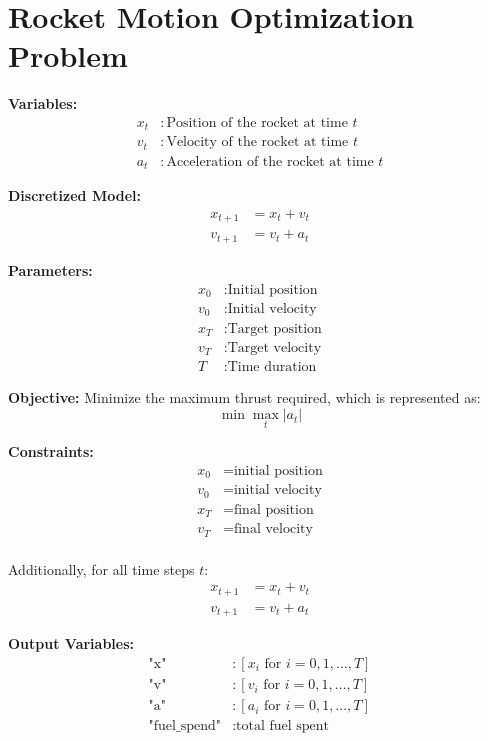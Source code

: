 \documentclass{article}
\begin{document}
\section*{Rocket Motion Optimization Problem}

\textbf{Variables:}
\begin{align*}
x_t & : \text{Position of the rocket at time } t \\
v_t & : \text{Velocity of the rocket at time } t \\
a_t & : \text{Acceleration of the rocket at time } t 
\end{align*}

\textbf{Discretized Model:}
\begin{align*}
x_{t+1} & = x_t + v_t \\
v_{t+1} & = v_t + a_t 
\end{align*}

\textbf{Parameters:}
\begin{align*}
x_0 & : \text{Initial position} \\
v_0 & : \text{Initial velocity} \\
x_T & : \text{Target position} \\
v_T & : \text{Target velocity} \\
T & : \text{Time duration}
\end{align*}

\textbf{Objective:} 
Minimize the maximum thrust required, which is represented as:
\[
\min \max_{t} |a_t|
\]

\textbf{Constraints:}
\begin{align*}
x_0 & = \text{initial position} \\
v_0 & = \text{initial velocity} \\
x_T & = \text{final position} \\
v_T & = \text{final velocity} \\
\end{align*}

Additionally, for all time steps \( t \):
\begin{align*}
x_{t+1} & = x_t + v_t \\
v_{t+1} & = v_t + a_t 
\end{align*}

\textbf{Output Variables:}
\begin{align*}
\text{"x"} & : [x_i \text{ for } i = 0, 1, \ldots, T] \\
\text{"v"} & : [v_i \text{ for } i = 0, 1, \ldots, T] \\
\text{"a"} & : [a_i \text{ for } i = 0, 1, \ldots, T] \\
\text{"fuel\_spend"} & : \text{total fuel spent}
\end{align*}
\end{document}
